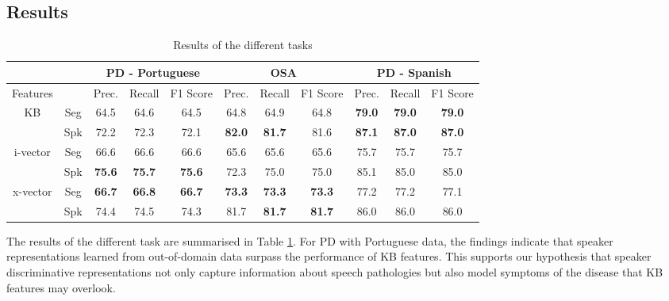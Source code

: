\subsection{Results}
\begin{table}[h]
  \begin{tabular}{cc|ccc|ccc|ccc}
                            &     & \multicolumn{3}{c|}{PD - Portuguese} & \multicolumn{3}{c|}{OSA}                      & \multicolumn{3}{c}{PD - Spanish} \\ \hline
  Features                  &     & Prec.        & Recall           & F1 Score        & Prec.     & Recall        & F1 Score      & Prec.       & Recall         & F1 Score       \\ \hline
  \multirow{2}{*}{KB}       & Seg & 64.5             & 64.6             & 64.5            & 64.8          & 64.9          & 64.8          & \textbf{79.0}   & \textbf{79.0}  & \textbf{79.0}  \\
                            & Spk & 72.2             & 72.3             & 72.1            & \textbf{82.0} & \textbf{81.7} & 81.6          & \textbf{87.1}   & \textbf{87.0}  & \textbf{87.0}  \\ \hline
  \multirow{2}{*}{i-vector} & Seg & 66.6             & 66.6             & 66.6            & 65.6          & 65.6          & 65.6          & 75.7            & 75.7           & 75.7           \\
                            & Spk & \textbf{75.6}    & \textbf{75.7}    & \textbf{75.6}   & 72.3          & 75.0          & 75.0          & 85.1            & 85.0           & 85.0           \\ \hline
  \multirow{2}{*}{x-vector} & Seg & \textbf{66.7}    & \textbf{66.8}    & \textbf{66.7}   & \textbf{73.3} & \textbf{73.3} & \textbf{73.3} & 77.2            & 77.2           & 77.1           \\
                            & Spk & 74.4             & 74.5             & 74.3            & 81.7          & \textbf{81.7} & \textbf{81.7} & 86.0            & 86.0           & 86.0     
  \end{tabular}
  \caption{Results of the different tasks}
  \label{tab:xvect_results}
  \end{table}
The results of the different task are summarised in Table \ref{tab:xvect_results}. For PD with Portuguese data, the findings indicate that speaker representations learned from out-of-domain data surpass the performance of KB features. This supports our hypothesis that speaker discriminative representations not only capture information about speech pathologies but also model symptoms of the disease that KB features may overlook.

